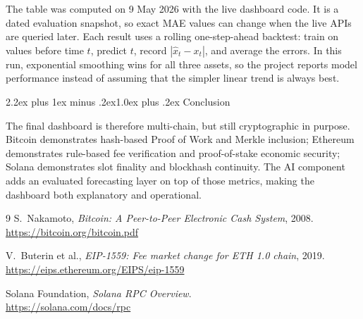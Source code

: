 \documentclass[11pt,a4paper]{article}
\makeatletter
\renewcommand{\section}{\@startsection{section}{1}{0pt}%
  {2.2ex plus 1ex minus .2ex}{1.0ex plus .2ex}%
  {\color{btcgreen}\large\bfseries\sffamily}}
\makeatother
\begin{document}
The table was computed on 9 May 2026 with the live dashboard code. It is a
dated evaluation snapshot, so exact MAE values can change when the live APIs
are queried later. Each result
uses a rolling one-step-ahead backtest: train on values before time $t$,
predict $t$, record $|\hat{x}_t-x_t|$, and average the errors. In this run,
exponential smoothing wins for all three assets, so the project reports model
performance instead of assuming that the simpler linear trend is always best.

\section{Conclusion}

The final dashboard is therefore multi-chain, but still cryptographic in
purpose. Bitcoin demonstrates hash-based Proof of Work and Merkle inclusion;
Ethereum demonstrates rule-based fee verification and proof-of-stake economic
security; Solana demonstrates slot finality and blockhash continuity. The AI
component adds an evaluated forecasting layer on top of those metrics, making
the dashboard both explanatory and operational.

\begin{thebibliography}{9}
\small
{}
S.~Nakamoto, \emph{Bitcoin: A Peer-to-Peer Electronic Cash System}, 2008.\\
\url{https://bitcoin.org/bitcoin.pdf}

V.~Buterin et al., \emph{EIP-1559: Fee market change for ETH 1.0 chain}, 2019.\\
\url{https://eips.ethereum.org/EIPS/eip-1559}

Solana Foundation, \emph{Solana RPC Overview}.\\
\url{https://solana.com/docs/rpc}
\end{thebibliography}
\end{document}
